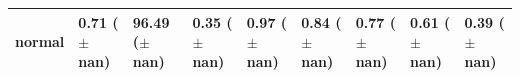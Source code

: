 \begin{tabular}{lllllllll}
normal & \makecell{0.71 \\ ($\pm$ nan)} & \makecell{96.49 \\ ($\pm$ nan)} & \makecell{0.35 \\ ($\pm$ nan)} & \makecell{0.97 \\ ($\pm$ nan)} & \makecell{0.84 \\ ($\pm$ nan)} & \makecell{0.77 \\ ($\pm$ nan)} & \makecell{0.61 \\ ($\pm$ nan)} & \makecell{0.39 \\ ($\pm$ nan)} \\
\bottomrule
\end{tabular}

